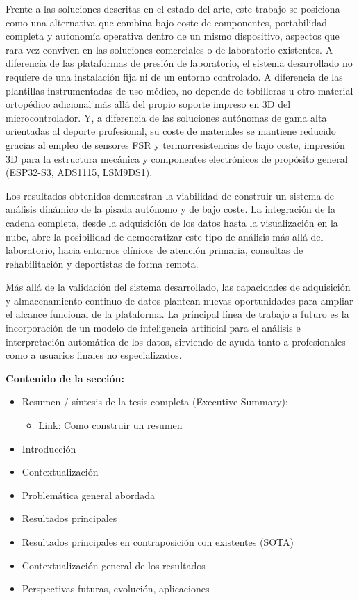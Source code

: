 \begin{IAtext}
Frente a las soluciones descritas en el estado del arte, este trabajo se posiciona como una alternativa que combina bajo coste de componentes, portabilidad completa y autonomía operativa dentro de un mismo dispositivo, aspectos que rara vez conviven en las soluciones comerciales o de laboratorio existentes. A diferencia de las plataformas de presión de laboratorio, el sistema desarrollado no requiere de una instalación fija ni de un entorno controlado. A diferencia de las plantillas instrumentadas de uso médico, no depende de tobilleras u otro material ortopédico adicional más allá del propio soporte impreso en 3D del microcontrolador. Y, a diferencia de las soluciones autónomas de gama alta orientadas al deporte profesional, su coste de materiales se mantiene reducido gracias al empleo de sensores FSR y termorresistencias de bajo coste, impresión 3D para la estructura mecánica y componentes electrónicos de propósito general (ESP32-S3, ADS1115, LSM9DS1).
\end{IAtext}

Los resultados obtenidos demuestran la viabilidad de construir un sistema de análisis dinámico de la pisada autónomo y de bajo coste. La integración de la cadena completa, desde la adquisición de los datos hasta la visualización en la nube, abre la posibilidad de democratizar este tipo de análisis más allá del laboratorio, hacia entornos clínicos de atención primaria, consultas de rehabilitación y deportistas de forma remota.

Más allá de la validación del sistema desarrollado, las capacidades de adquisición y almacenamiento continuo de datos plantean nuevas oportunidades para ampliar el alcance funcional de la plataforma. La principal línea de trabajo a futuro es la incorporación de un modelo de inteligencia artificial para el análisis e interpretación automática de los datos, sirviendo de ayuda tanto a profesionales como a usuarios finales no especializados.

\textbf{Contenido de la sección:}
\begin{itemize}
    \item Resumen / síntesis de la tesis completa (Executive Summary):
    \begin{itemize}
        \item \href{https://s3-service-broker-live-19ea8b98-4d41-4cb4-be4c-d68f4963b7dd.s3.amazonaws.com/uploads/ckeditor/attachments/7808/2c_Summary_para.pdf}{Link: Como construir un resumen}
    \end{itemize}
    \item Introducción
    \item Contextualización
    \item Problemática general abordada
    \item Resultados principales
    \item Resultados principales en contraposición con existentes (SOTA)
    \item Contextualización general de los resultados
    \item Perspectivas futuras, evolución, aplicaciones
\end{itemize}